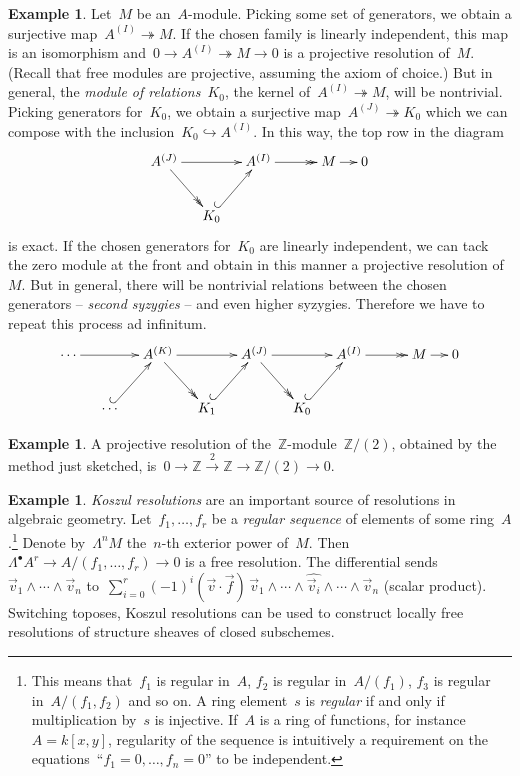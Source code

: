 \documentclass{amsart}
\theoremstyle{definition}
\newtheorem{ex}[defn]{Example}
\theoremstyle{plain}
\theoremstyle{remark}
\newcommand{\ZZ}{\mathbb{Z}}
\newcommand{\?}{\,{:}\,}
\renewcommand{\_}{\mathpunct{.}\,}
\begin{document}
\begin{ex}\label{ex:syzygies-resolution}Let~$M$ be an~$A$-module. Picking some
set of generators, we obtain a surjective map~$A^{(I)} \twoheadrightarrow M$.
If the chosen family is linearly independent, this map is an isomorphism and~$0
\to A^{(I)} \twoheadrightarrow M \to 0$ is a projective resolution of~$M$.
(Recall that free modules are projective, assuming the axiom of choice.) But in
general, the \emph{module of relations}~$K_0$, the kernel of~$A^{(I)}
\twoheadrightarrow M$, will be nontrivial. Picking generators for~$K_0$, we
obtain a surjective map~$A^{(J)} \twoheadrightarrow K_0$ which we can compose
with the inclusion~$K_0 \hookrightarrow A^{(I)}$. In this way, the top row in
the diagram
\[ \xymatrixcolsep{1pc}\xymatrix{
  A^{(J)} \ar[rr] \ar@{->>}[rd] & & A^{(I)} \ar@{->>}[rr] && M \ar[r] & 0 \\
  & K_0 \ar@{^{(}->}[ru]
} \]
is exact. If the chosen generators for~$K_0$ are linearly independent, we can
tack the zero module at the front and obtain in this manner a projective
resolution of~$M$. But in general, there will be nontrivial relations between
the chosen generators -- \emph{second syzygies} -- and even higher syzygies.
Therefore we have to repeat this process ad infinitum.
\[ \xymatrixcolsep{1pc}\xymatrix{
  \cdots \ar[rr] && A^{(K)} \ar@{->>}[rd] \ar[rr] && A^{(J)} \ar[rr] \ar@{->>}[rd] & & A^{(I)} \ar@{->>}[rr] && M \ar[r] & 0 \\
  & \cdots \ar@{^{(}->}[ru] && K_1 \ar@{^{(}->}[ru] && K_0 \ar@{^{(}->}[ru]
} \]
\end{ex}

\begin{ex}\label{ex:res-z2}A projective resolution of
the~$\ZZ$-module~$\ZZ/(2)$, obtained by the method just sketched, is~$0 \to \ZZ
\stackrel{2}{\to} \ZZ \to \ZZ/(2) \to 0$.
\end{ex}

\begin{ex}\emph{Koszul resolutions} are an important source of resolutions in
algebraic geometry. Let~$f_1,\ldots,f_r$ be a \emph{regular
sequence} of elements of some ring~$A$.\footnote{This means that~$f_1$ is
regular in~$A$, $f_2$ is regular in~$A/(f_1)$, $f_3$ is regular
in~$A/(f_1,f_2)$ and so on. A ring element~$s$ is \emph{regular} if and only if
multiplication by~$s$ is injective. If~$A$ is a ring of functions, for
instance~$A = k[x,y]$, regularity of the sequence is intuitively a requirement on the
equations~``$f_1=0,\ldots,f_n=0$'' to be independent.} Denote by~$\Lambda^n M$
the~$n$-th exterior power of~$M$. Then~$\Lambda^\bullet A^r \to
A/(f_1,\ldots,f_r) \to 0$ is a free resolution. The
differential sends~$\vec v_1 \wedge \cdots \wedge \vec v_n$ to~$\sum_{i=0}^r
(-1)^i (\vec v \cdot \vec f)\, \vec v_1 \wedge \cdots \wedge \widehat{\vec v_i}
\wedge \cdots \wedge \vec v_n$ (scalar product). Switching toposes, Koszul
resolutions can be used to construct locally free resolutions of structure
sheaves of closed subschemes.
\end{ex}
\end{document}
